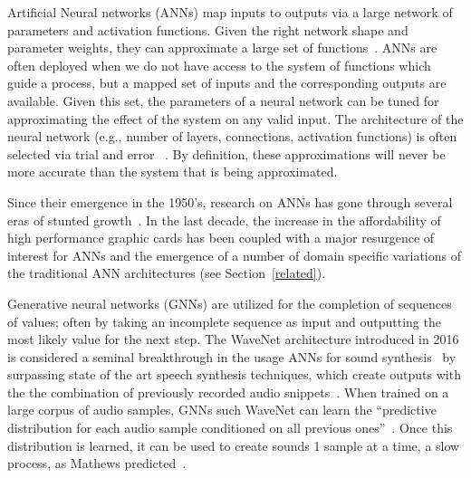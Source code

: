 \documentclass[\main/thesis.tex]{subfiles}
\begin{document}
Artificial Neural networks (ANNs) map inputs to outputs via a large network of parameters and activation functions. Given the right network shape and parameter weights, they can approximate a large set of functions~\cite{cybenko1989approximation,cardaliaguet1992approximation}. ANNs are often deployed when we do not have access to the system of functions which guide a process, but a mapped set of inputs and the corresponding outputs are available. Given this set, the parameters of a neural network can be tuned for approximating the effect of the system on any valid input. The architecture of the neural network (e.g., number of layers, connections, activation functions) is often selected via trial and error ~\cite{bergstra2012random,bergstra2011algorithms,ba2013adaptive}. By definition, these approximations will never be more accurate than the system that is being approximated. 

Since their emergence in the 1950's, research on ANNs has gone through several eras of stunted growth~\cite{basheer2000artificial,anderson1988neurocomputing}.  In the last decade, the increase in the affordability of high performance graphic cards has been coupled with a major resurgence of interest for ANNs and the emergence of a number of domain specific variations of the traditional ANN architectures (see Section~\ref{related}). 

Generative neural networks (GNNs) are utilized for the completion of sequences of values; often by taking an incomplete sequence as input and outputting the most likely value for the next step. The WaveNet architecture introduced in 2016 is considered a seminal breakthrough in the usage ANNs for sound synthesis~\cite{oord2016wavenet} by surpassing state of the art speech synthesis techniques, which create outputs with the the combination of previously recorded audio snippets~\cite{schwarz2007corpus}. When trained on a large corpus of audio samples, GNNs such WaveNet can learn the \enquote{predictive distribution for each
audio sample conditioned on all previous ones}~\cite{oord2016wavenet}. Once this distribution is learned, it can be used to create sounds 1 sample at a time, a slow process, as Mathews predicted~\cite{mathews1963digital}. \\
\end{document}
